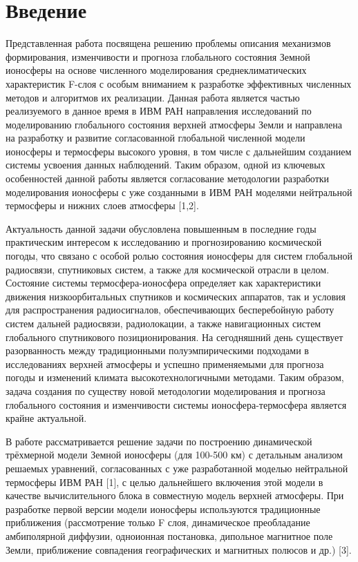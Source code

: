 \documentclass[14pt, a4paper, fleqn]{extarticle}
\begin{document}
\tableofcontents
\clearpage

\section{Введение}
Представленная работа посвящена решению проблемы описания механизмов формирования, изменчивости и прогноза глобального состояния Земной ионосферы на основе численного моделирования среднеклиматических характеристик F-слоя с особым вниманием к разработке эффективных численных методов и алгоритмов их реализации. Данная работа является частью реализуемого в данное время в ИВМ РАН направления исследований по моделированию глобального состояния верхней атмосферы Земли и направлена на разработку и развитие согласованной глобальной численной модели ионосферы и термосферы высокого уровня, в том числе с дальнейшим созданием системы усвоения данных наблюдений. Таким образом, одной из ключевых особенностей данной работы является согласование методологии разработки моделирования ионосферы с уже созданными в ИВМ РАН моделями нейтральной термосферы и нижних слоев атмосферы [1,2].

Актуальность данной задачи обусловлена повышенным в последние годы практическим интересом к исследованию и прогнозированию космической погоды, что связано с особой ролью состояния ионосферы для систем глобальной радиосвязи, спутниковых систем, а также для космической отрасли в целом. Состояние системы термосфера-ионосфера определяет как характеристики движения низкоорбитальных спутников и космических аппаратов, так и условия для распространения радиосигналов, обеспечивающих бесперебойную работу систем дальней радиосвязи, радиолокации, а также навигационных систем глобального спутникового позиционирования. На сегодняшний день существует разорванность между традиционными полуэмпирическими подходами в исследованиях верхней атмосферы и успешно применяемыми для прогноза погоды и изменений климата высокотехнологичными методами. Таким образом, задача создания по существу новой методологии моделирования и прогноза глобального состояния и изменчивости системы ионосфера-термосфера является крайне актуальной.

В работе рассматривается решение задачи по построению динамической трёхмерной модели Земной ионосферы (для 100-500 км) с детальным анализом решаемых уравнений, согласованных с уже разработанной моделью нейтральной термосферы ИВМ РАН [1], с  целью дальнейшего включения этой модели в качестве вычислительного блока в совместную модель верхней атмосферы. При разработке первой версии модели ионосферы используются традиционные приближения (рассмотрение только F слоя, динамическое преобладание амбиполярной диффузии, одноионная постановка, дипольное магнитное поле Земли, приближение совпадения географических и магнитных полюсов и др.) [3]. 
\end{document}
